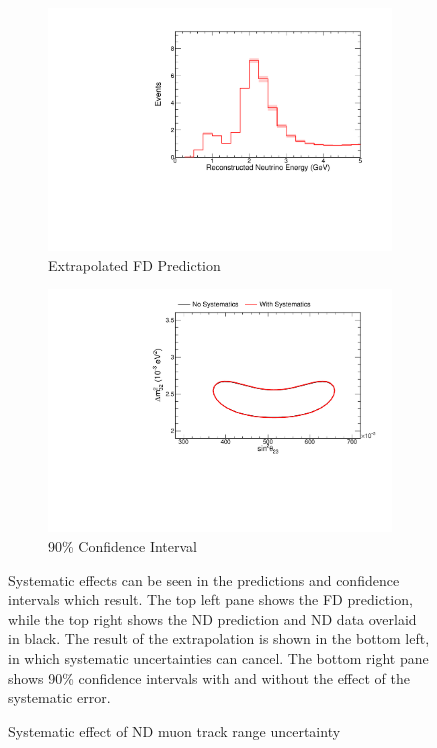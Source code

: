 {\begin{figure}
\begin{center}
\begin{subfigure}[c]{0.49\textwidth}
\includegraphics[width=\textwidth]{figures/systs/prediction/fd_extrap_prediction_trkLenND.pdf}
\caption*{Extrapolated FD Prediction}
\end{subfigure}
\begin{subfigure}[c]{0.49\textwidth}
\includegraphics[width=\textwidth]{figures/systs/prediction/fd_extrap_contour_trkLenND.pdf}
\caption*{90\% Confidence Interval}
\end{subfigure}
\end{center}
\caption{Systematic effect of ND muon track range uncertainty}{
Systematic effects can be seen in the predictions and confidence intervals
which result.
The top left pane shows the FD prediction, while the top right shows the
ND prediction and ND data overlaid in black.
The result of the extrapolation is shown in the bottom left, in which
systematic uncertainties can cancel.
The bottom right pane shows 90\% confidence intervals with and without
the effect of the systematic error.}
\label{syst_fig_trkLenND}


\end{figure}}
